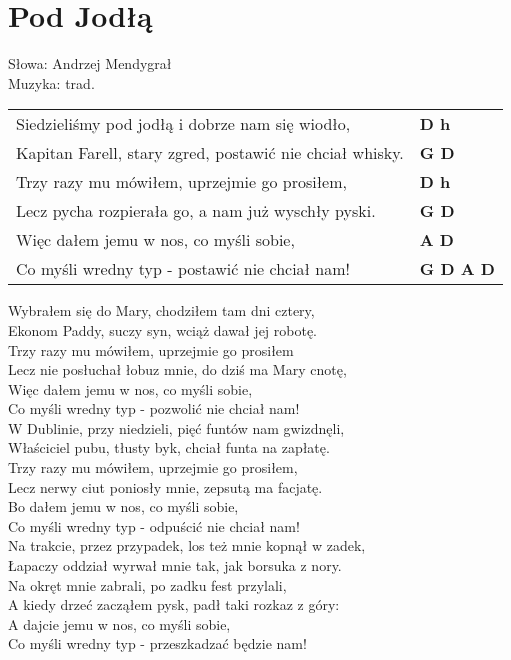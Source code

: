 \section{Pod Jodłą}

Słowa: Andrzej Mendygrał\\
Muzyka:  trad.

\vspace{2em}
\begin{tabular}{@{}p{9cm}@{}l@{}}
Siedzieliśmy pod jodłą i dobrze nam się wiodło, & \bfseries D h \\
Kapitan Farell, stary zgred, postawić nie chciał whisky. & \bfseries G D \\
Trzy razy mu mówiłem, uprzejmie go prosiłem, & \bfseries D h \\
Lecz pycha rozpierała go, a nam już wyschły pyski. & \bfseries G D \\
Więc dałem jemu w nos, co myśli sobie, & \bfseries A D \\
Co myśli wredny typ - postawić nie chciał nam! & \bfseries G D A D \\
\end{tabular}

\vspace{1em}
Wybrałem się do Mary, chodziłem tam dni cztery, \\
Ekonom Paddy, suczy syn, wciąż dawał jej robotę. \\
Trzy razy mu mówiłem, uprzejmie go prosiłem \\
Lecz nie posłuchał łobuz mnie, do dziś ma Mary cnotę, \\
Więc dałem jemu w nos, co myśli sobie, \\
Co myśli wredny typ - pozwolić nie chciał nam! \\

W Dublinie, przy niedzieli, pięć funtów nam gwizdnęli, \\
Właściciel pubu, tłusty byk, chciał funta na zapłatę. \\
Trzy razy mu mówiłem, uprzejmie go prosiłem, \\
Lecz nerwy ciut poniosły mnie, zepsutą ma facjatę. \\
Bo dałem jemu w nos, co myśli sobie, \\
Co myśli wredny typ - odpuścić nie chciał nam! \\

Na trakcie, przez przypadek, los też mnie kopnął w zadek, \\
Łapaczy oddział wyrwał mnie tak, jak borsuka z nory. \\
Na okręt mnie zabrali, po zadku fest przylali, \\
A kiedy drzeć zacząłem pysk, padł taki rozkaz z góry: \\
A dajcie jemu w nos, co myśli sobie, \\
Co myśli wredny typ - przeszkadzać będzie nam! \\
